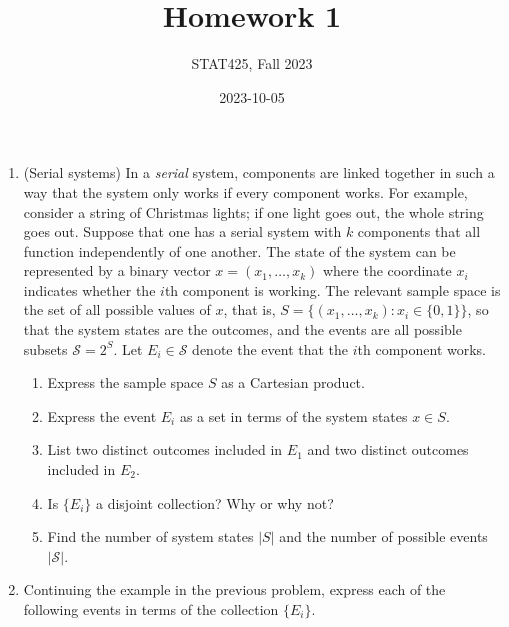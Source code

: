 \documentclass[
  letterpaper,
  DIV=11,
  numbers=noendperiod]{scrartcl}
\title{Homework 1}
\author{STAT425, Fall 2023}
\date{2023-10-05}
\providecommand{\tightlist}{%
  \setlength{\itemsep}{0pt}\setlength{\parskip}{0pt}}\usepackage{longtable,booktabs,array}
\begin{document}
\pagestyle{fancy}
\ifdefined\Shaded\renewenvironment{Shaded}{\begin{tcolorbox}[enhanced, breakable, boxrule=0pt, borderline west={3pt}{0pt}{shadecolor}, interior hidden, sharp corners, frame hidden]}{\end{tcolorbox}}\fi

\begin{enumerate}
\def\labelenumi{\arabic{enumi}.}
\item
  (Serial systems) In a \emph{serial} system, components are linked
  together in such a way that the system only works if every component
  works. For example, consider a string of Christmas lights; if one
  light goes out, the whole string goes out. Suppose that one has a
  serial system with \(k\) components that all function independently of
  one another. The state of the system can be represented by a binary
  vector \(x = (x_1, \dots, x_k)\) where the coordinate \(x_i\)
  indicates whether the \(i\)th component is working. The relevant
  sample space is the set of all possible values of \(x\), that is,
  \(S = \{(x_1, \dots, x_k): x_i \in \{0, 1\}\}\), so that the system
  states are the outcomes, and the events are all possible subsets
  \(\mathcal{S} = 2^S\). Let \(E_i \in \mathcal{S}\) denote the event
  that the \(i\)th component works.

  \begin{enumerate}
  \def\labelenumii{\roman{enumii}.}
  \tightlist
  \item
    Express the sample space \(S\) as a Cartesian product.
  \item
    Express the event \(E_i\) as a set in terms of the system states
    \(x \in S\).
  \item
    List two distinct outcomes included in \(E_1\) and two distinct
    outcomes included in \(E_2\).
  \item
    Is \(\{E_i\}\) a disjoint collection? Why or why not?
  \item
    Find the number of system states \(|S|\) and the number of possible
    events \(|\mathcal{S}|\).
  \end{enumerate}

\newpage
\item
  Continuing the example in the previous problem, express each of the
  following events in terms of the collection \(\{E_i\}\).


\end{enumerate}
\end{document}
